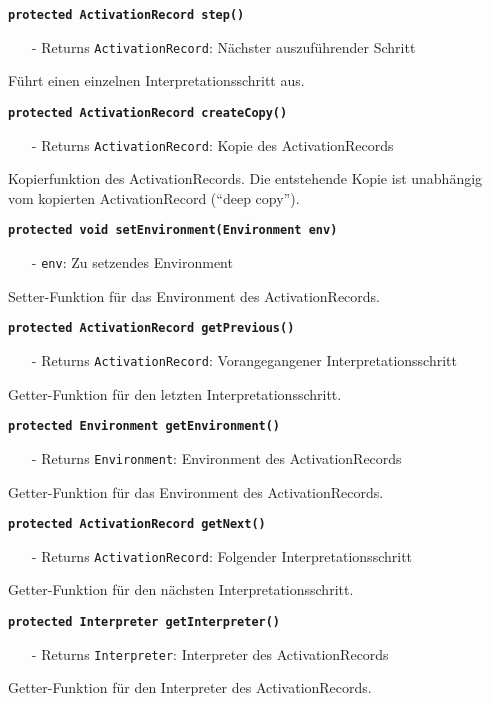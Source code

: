 \documentclass[parskip=full,11pt,twoside]{scrartcl}
\begin{document}
\textbf{\texttt{protected ActivationRecord step()}}
\begin{itemize}[noitemsep]
	\item[-] Returns \texttt{ActivationRecord}: Nächster auszuführender Schritt
\end{itemize}
Führt einen einzelnen Interpretationsschritt aus.

\textbf{\texttt{protected ActivationRecord createCopy()}}
\begin{itemize}[noitemsep]
	\item[-] Returns \texttt{ActivationRecord}: Kopie des ActivationRecords
\end{itemize}
Kopierfunktion des ActivationRecords. Die entstehende Kopie ist unabhängig vom kopierten ActivationRecord (\enquote{deep copy}).

\textbf{\texttt{protected void setEnvironment(Environment env)}}
\begin{itemize}[noitemsep]
	\item[-] \texttt{env}: Zu setzendes Environment
\end{itemize}
Setter-Funktion für das Environment des ActivationRecords.

\textbf{\texttt{protected ActivationRecord getPrevious()}}
\begin{itemize}[noitemsep]
	\item[-] Returns \texttt{ActivationRecord}: Vorangegangener Interpretationsschritt
\end{itemize}
Getter-Funktion für den letzten Interpretationsschritt.

\textbf{\texttt{protected Environment getEnvironment()}}
\begin{itemize}[noitemsep]
	\item[-] Returns \texttt{Environment}: Environment des ActivationRecords
\end{itemize}
Getter-Funktion für das Environment des ActivationRecords.

\textbf{\texttt{protected ActivationRecord getNext()}}
\begin{itemize}[noitemsep]
	\item[-] Returns \texttt{ActivationRecord}: Folgender Interpretationsschritt
\end{itemize}
Getter-Funktion für den nächsten Interpretationsschritt.

\textbf{\texttt{protected Interpreter getInterpreter()}}
\begin{itemize}[noitemsep]
	\item[-] Returns \texttt{Interpreter}: Interpreter des ActivationRecords
\end{itemize}
Getter-Funktion für den Interpreter des ActivationRecords.
\end{document}
